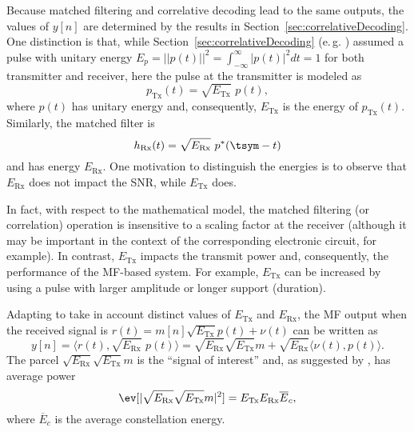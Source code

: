 Because matched filtering and correlative decoding lead to the same outputs,
the values of $y[n]$ are determined by the results in Section~\ref{sec:correlativeDecoding}. 
One distinction is that, while Section~\ref{sec:correlativeDecoding}
(e.\,g. ) assumed a pulse with unitary energy $E_p = || p(t) ||^2 = \int_{-\infty}^{\infty} |p(t)|^2 dt = 1$ for both transmitter and receiver, here the pulse at the transmitter is 
modeled as
\[
p_{\textrm{Tx}}(t) = \sqrt{E_{\textrm{Tx}}} \textrm{~} p(t),
\]
where $p(t)$ has unitary energy and, consequently, $E_{\textrm{Tx}}$ is the energy of $p_{\textrm{Tx}}(t)$. Similarly, the matched filter is
\[
h_{\textrm{Rx}}(t) = \sqrt{E_{\textrm{Rx}}} \textrm{~} p^*(\tsym - t)
\]
and has energy $E_{\textrm{Rx}}$. One motivation to distinguish the energies is to observe
that $E_{\textrm{Rx}}$ does not impact the SNR, while $E_{\textrm{Tx}}$ does.

In fact, with respect to the mathematical model, the matched filtering (or correlation) operation is insensitive to a scaling factor at the receiver (although it may be important
 in the context of the corresponding electronic circuit, for example).
In contrast, $E_{\textrm{Tx}}$ impacts the transmit power and, consequently, the performance
 of the MF-based system. For example, $E_{\textrm{Tx}}$ can be increased by using a pulse with larger amplitude or longer support (duration).

Adapting  to take in account distinct values of $E_{\textrm{Tx}}$  and $E_{\textrm{Rx}}$, the MF output when the received signal is $r(t)=m[n] \sqrt{E_{\textrm{Tx}}} p(t) + \nu(t)$ can be written as
\begin{equation}
y[n]=\langle r(t), \sqrt{E_{\textrm{Rx}}} \textrm{~} p(t) \rangle = 
 \sqrt{E_{\textrm{Rx}}} \sqrt{E_{\textrm{Tx}}} m + \sqrt{E_{\textrm{Rx}}} \langle \nu(t), p(t) \rangle.
\end{equation}
The parcel $\sqrt{E_{\textrm{Rx}}} \sqrt{E_{\textrm{Tx}}} m$ is the ``signal of interest''
and, as suggested by , has average power 
\begin{equation}
\ev[|\sqrt{E_{\textrm{Rx}}} \sqrt{E_{\textrm{Tx}}} m|^2] = E_{\textrm{Tx}} E_{\textrm{Rx}} \overline E_c,
\label{eq:mfOutputSignalOfInterest}
\end{equation}
where $\overline E_c$ is the average constellation energy.

